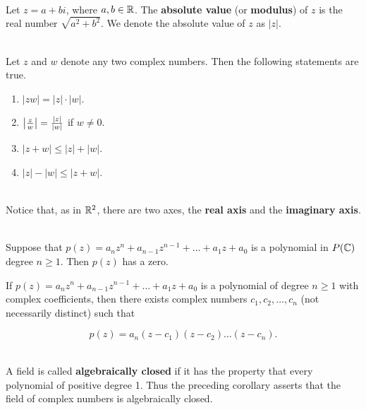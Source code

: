 \begin{alphasection}
	\begin{definition}
		\hfill\\
		Let $z = a + bi$, where $a,b \in \mathbb{R}$. The \textbf{absolute value} (or \textbf{modulus}) of $z$ is the real number $\sqrt{a^2 + b^2}$. We denote the absolute value of $z$ as $|z|$.
	\end{definition}

	\begin{theorem}
		\hfill\\
		Let $z$ and $w$ denote any two complex numbers. Then the following statements are true.

		\begin{enumerate}
			\item $|zw| = |z| \cdot |w|$.
			\item $\left\lvert \frac{z}{w} \right\rvert = \frac{|z|}{|w|}$ if $w \neq 0$.
			\item $|z + w| \leq |z| + |w|$.
			\item $|z| - |w| \leq |z + w|$.
		\end{enumerate}
	\end{theorem}

	\begin{definition}
		\hfill\\
		Notice that, as in $\mathbb{R}^2$, there are two axes, the \textbf{real axis} and the \textbf{imaginary axis}.
	\end{definition}

	\begin{theorem}
		\hfill\\
		Suppose that $p(z) = a_nz^n + a_{n-1}z^{n-1} + \dots + a_1z + a_0$ is a polynomial in $P(\mathbb{C})$ degree $n \geq 1$. Then $p(z)$ has a zero.
	\end{theorem}

	\begin{corollary}
		If $p(z) = a_nz^n + a_{n-1}z^{n-1} + \dots + a_1z + a_0$ is a polynomial of degree $n \geq 1$ with complex coefficients, then there exists complex numbers $c_1, c_2, \dots, c_n$ (not necessarily distinct) such that

		\[p(z) = a_n(z-c_1)(z-c_2)\dots(z-c_n).\]
	\end{corollary}

	\begin{definition}
		\hfill\\
		A field is called \textbf{algebraically closed} if it has the property that every polynomial of positive degree 1. Thus the preceding corollary asserts that the field of complex numbers is algebraically closed.
	\end{definition}
\end{alphasection}
